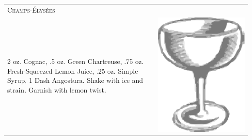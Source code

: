 \documentclass{article}
\begin{document}
\begin{tabular}{p{2in} p{0.5in}}
  \multicolumn{2}{p{3in}}{\centering\Huge\textsc{Champs-\'{E}lys\'{e}es}} \\ 
  
   \vspace{-0.1in}2 oz. Cognac, .5 oz. Green Chartreuse, .75 oz.
    Fresh-Squeezed Lemon Juice, .25 oz. Simple Syrup, 1 Dash
    Angostura. Shake with ice and strain.  Garnish with lemon twist.
  &  \vspace{-0.1in} \includegraphics{egg_coupe.png}
\end{tabular}
\end{document}
